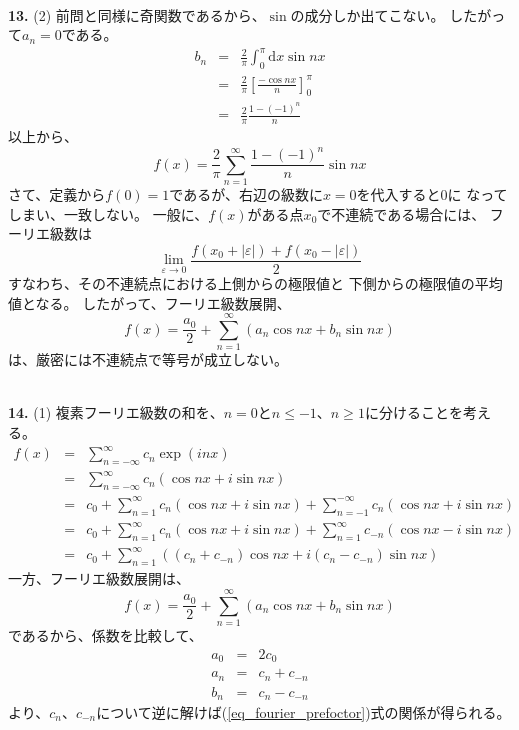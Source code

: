 \documentclass{jarticle}
\newcommand{\diff}{\mathrm d}
\newcommand{\ans}[2]{\noindent\\ {\bf \large #1.} (#2)}
\begin{document}
\ans{13}{2}
前問と同様に奇関数であるから、$\sin$の成分しか出てこない。
したがって$a_n=0$である。
\begin{eqnarray}
  b_n &=& \frac{2}{\pi} \int_0^{\pi} \diff x  \sin nx\\
  &=& \frac{2}{\pi}  \left[ \frac{- \cos nx}{n}  \right]_0^\pi\\
  &=& \frac{2}{\pi} \frac{1 - (-1)^n}{n}
\end{eqnarray}
以上から、
\begin{equation}
  f(x) = \frac{2}{\pi} \sum_{n=1}^{\infty} \frac{1 - (-1)^n}{n} \sin nx
\end{equation}
さて、定義から$f(0) = 1$であるが、右辺の級数に$x=0$を代入すると$0$に
なってしまい、一致しない。
一般に、$f(x)$がある点$x_0$で不連続である場合には、
フーリエ級数は
\begin{equation}
  \lim_{\varepsilon \rightarrow 0} \frac{f(x_0 + |\varepsilon|) + f(x_0 - |\varepsilon|) }{2}
\end{equation}
すなわち、その不連続点における上側からの極限値と
下側からの極限値の平均値となる。
したがって、フーリエ級数展開、
\begin{equation}
  f(x) = \frac{a_0}{2} + \sum_{n=1}^\infty (a_n \cos nx + b_n \sin nx)
\end{equation}
は、厳密には不連続点で等号が成立しない。

\ans{14}{1}
複素フーリエ級数の和を、$n=0$と$n\le -1$、$n \ge 1$に分けることを考える。
\begin{eqnarray}
  f(x) &=& \sum_{n=-\infty}^{\infty} c_n \exp{(inx)}\\
  &=& \sum_{n=-\infty}^{\infty} c_n (\cos nx + i \sin nx)\\
  &=& c_0 + \sum_{n=1}^{\infty} c_n (\cos nx + i \sin nx)
  + \sum_{n=-1}^{-\infty} c_n (\cos nx + i \sin nx)\\
  &=& c_0 + \sum_{n=1}^{\infty} c_n (\cos nx + i \sin nx)
  + \sum_{n=1}^{\infty} c_{-n} (\cos nx - i \sin nx)\\
  &=& c_0 + \sum_{n=1}^{\infty} \left( (c_n+c_{-n}) \cos nx + i(c_n-c_{-n}) \sin nx  \right)
\end{eqnarray}
一方、フーリエ級数展開は、
\begin{equation}
  f(x) = \frac{a_0}{2} + \sum_{n=1}^{\infty} \left( a_n \cos nx + b_n \sin nx  \right)
\end{equation}
であるから、係数を比較して、
\begin{eqnarray}
  a_0 &=& 2 c_0 \\
  a_n &=& c_n + c_{-n} \\
  b_n &=& c_n - c_{-n}
\end{eqnarray}
より、$c_n$、$c_{-n}$について逆に解けば(\ref{eq_fourier_prefoctor})式の関係が得られる。
\end{document}
